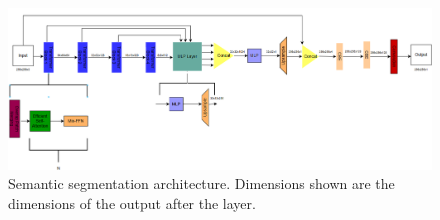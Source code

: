 \documentclass[11pt]{ociamthesis}  %
\begin{document}
\begin{figure}
    \centering
    \includegraphics[width=0.9\linewidth]{figures/SegFormer Architecture Draw.png}
    \caption{Semantic segmentation architecture. Dimensions shown are the dimensions of the output after the layer.}
    \label{fig:SegFormer + CBE Architecture}
\end{figure}
\end{document}
